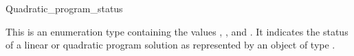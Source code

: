 \begin{ccRefClass}{Quadratic_program_status}


\ccDefinition
This is an enumeration type containing the values
, , and .
It indicates the status of a linear or quadratic program solution
as represented by an object of type
.

\ccSeeAlso

\end{ccRefClass}
